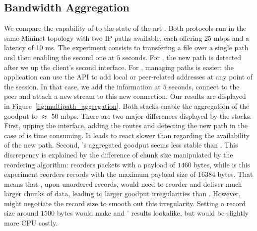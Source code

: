 \subsection{Bandwidth Aggregation}

We compare the capability of \tcpls to the state of the art \mptcp. Both
protocols run in the same Mininet topology with two IP paths available, each
offering 25 mbps and a latency of 10 ms. The experiment consists to transfering
a file over a single path and then enabling the second one at $5$ seconds. For
\mptcp, the new path is detected after we up the client's second interface. For
\tcpls, managing paths is easier: the application can use the API to add local
or peer-related addresses at any point of the session. In that case, we add
the information at $5$ seconds, connect to the peer and attach a new stream to
this new connection. Our results are displayed in
Figure~\ref{fig:multipath_aggregation}. Both stacks enable the aggregation of the
goodput to  $\approx$ 50 mbps. There are two major differences displayed by the stacks.
First, upping the interface, adding the routes and detecting the new path in
the case of \mptcp is time consuming. It leads \mptcp to react slower than
\tcpls regarding the availability of the new path. Second, \tcpls's aggregated
goodput seems less stable than \mptcp. This discrepency is explained by the
difference of chunk size manipulated by the reordering algorithm: \mptcp
reorders packets with a payload of $1460$ bytes, while \tcpls is this experiment
reorders records with the maximum payload size of $16384$ bytes. That means
that \tcpls, upon unordered records, would need to reorder and deliver much
larger chunks of data, leading to larger goodput irregularities than \mptcp.
However, \tcpls might  negotiate the record size to smooth out this
irregularity. Setting a record size around $1500$ bytes would make \mptcp and
\tcpls' results lookalike, but would be slightly more CPU costly.

